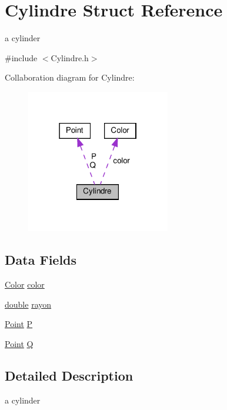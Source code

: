 \hypertarget{struct_cylindre}{}\section{Cylindre Struct Reference}
\label{struct_cylindre}


a cylinder  




{\ttfamily \#include $<$Cylindre.\+h$>$}



Collaboration diagram for Cylindre\+:\nopagebreak
\begin{figure}[H]
\begin{center}
\leavevmode
\includegraphics[width=178pt]{struct_cylindre__coll__graph}
\end{center}
\end{figure}
\subsection*{Data Fields}
\begin{DoxyCompactItemize}
\item 
\hyperlink{struct_color}{Color} \hyperlink{struct_cylindre_aa5f4d1eda21c196bd8401ff73f105073}{color}
\item 
\hyperlink{g3x__transfo_8h_a89b2b23e407882a535d835574a7912e1}{double} \hyperlink{struct_cylindre_a2459aedac9f8646ad9566164a9a83f41}{rayon}
\item 
\hyperlink{struct_point}{Point} \hyperlink{struct_cylindre_a8c362b40598e0f5315cbcd092760c0d2}{P}
\item 
\hyperlink{struct_point}{Point} \hyperlink{struct_cylindre_a20c58d187415dcf2911db42e12d5ee05}{Q}
\end{DoxyCompactItemize}


\subsection{Detailed Description}
a cylinder 

